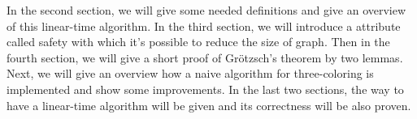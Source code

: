 In the second section, we will give some needed definitions and give an overview of this linear-time algorithm. In the third section, we will introduce a attribute called safety with which it's possible to reduce the size of graph. Then in the fourth section, we will give a short proof of Grötzsch's theorem by two lemmas. Next, we will give an overview how a naive algorithm for three-coloring is implemented and show some improvements. In the last two sections, the way to have a linear-time algorithm will be given and its correctness will be also proven. 
